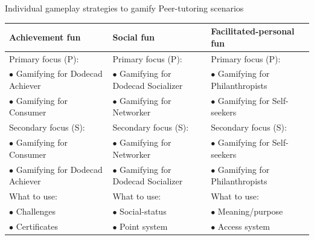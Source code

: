 \begin{quadro}[htb]
\caption{Individual gameplay strategies to gamify Peer-tutoring scenarios}
\label{tab:individual-gameplay-strategies-peer-tutoring-cl-scenarios}
\centering
\small
\begin{tabular}{l|l|l}


\hline%
\multicolumn{1}{p{4.75cm}}{\centering\textbf{Achievement fun}}&
\multicolumn{1}{|p{4.75cm}|}{\centering\textbf{Social fun}}&
\multicolumn{1}{p{4.75cm}}{\centering\textbf{Facilitated-personal fun}}\tabularnewline
\hline
\hline

Primary focus (P):&
Primary focus (P):&
Primary focus (P):\tabularnewline

{\scriptsize$\bullet$ Gamifying for Dodecad Achiever}&
{\scriptsize$\bullet$ Gamifying for Dodecad Socializer}&
{\scriptsize$\bullet$ Gamifying for Philanthropists}\tabularnewline

{\scriptsize$\bullet$ Gamifying for Consumer}&
{\scriptsize$\bullet$ Gamifying for Networker}&
{\scriptsize$\bullet$ Gamifying for Self-seekers}\tabularnewline


Secondary focus (S):&
Secondary focus (S):&
Secondary focus (S):\tabularnewline

{\scriptsize$\bullet$ Gamifying for Consumer}&
{\scriptsize$\bullet$ Gamifying for Networker}&
{\scriptsize$\bullet$ Gamifying for Self-seekers}\tabularnewline

{\scriptsize$\bullet$ Gamifying for Dodecad Achiever}&
{\scriptsize$\bullet$ Gamifying for Dodecad Socializer}&
{\scriptsize$\bullet$ Gamifying for Philanthropists}\tabularnewline
\hline

What to use:&
What to use:&
What to use:\tabularnewline

$\bullet$ Challenges&
$\bullet$ Social-status&
$\bullet$ Meaning/purpose\tabularnewline

$\bullet$ Certificates&
$\bullet$ Point system&
$\bullet$ Access system\tabularnewline


\end{tabular}
\end{quadro}
